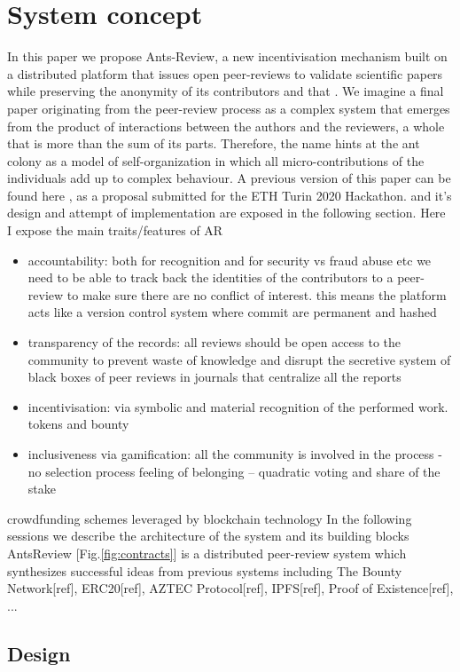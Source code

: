 \documentclass[runningheads]{llncs}
\begin{document}
\section{System concept}
In this paper we propose Ants-Review, a new incentivisation mechanism built on a distributed platform that issues open peer-reviews to validate scientific papers while preserving the anonymity of its contributors and that . We imagine a final paper originating from the peer-review process as a complex system that emerges from the product of interactions between the authors and the reviewers, a whole that is more than the sum of its parts. Therefore, the name hints at the ant colony as a model of self-organization in which all micro-contributions of the individuals add up to complex behaviour.
A previous version of this paper can be found here \cite{10.5281/zenodo.3828087}, as a proposal submitted for the ETH Turin 2020 Hackathon.
and it’s design and attempt of implementation are exposed in the following section.
Here I expose the main traits/features of AR
\begin{itemize}
\item accountability: both for recognition and for security vs fraud abuse etc we need to be able to track back the identities of the contributors to a peer-review to make sure there are no conflict of interest. this means the platform acts like a version control system where commit are permanent and hashed 
\item transparency of the records: all reviews should be open access to the community to prevent waste of knowledge and disrupt the secretive system of black boxes of peer reviews in journals that centralize all the reports 
\item incentivisation: via symbolic and material recognition of the performed work. tokens and bounty
\item inclusiveness via gamification: all the community is involved in the process - no selection process feeling of belonging -- quadratic voting and share of the stake
\end{itemize}
crowdfunding schemes leveraged by blockchain technology
In the following sessions we describe the architecture of the system and its building blocks
AntsReview [Fig.\ref{fig:contracts}] is a distributed peer-review system which synthesizes successful ideas from previous systems including The Bounty Network[ref], ERC20[ref], AZTEC Protocol[ref], IPFS[ref], Proof of Existence[ref], ...

\subsection{Design}
\end{document}
